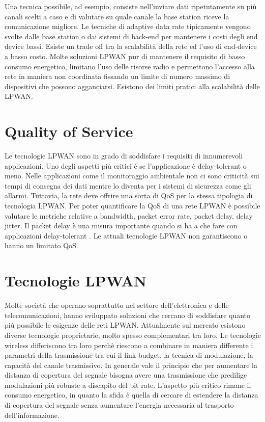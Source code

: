 \documentclass[12pt,a4paper,openright,twoside]{report}
\begin{document}
Una tecnica possibile, ad esempio, consiste nell'inviare dati ripetutamente su pi\`u canali scelti a caso e di valutare su quale canale la base station riceve la comunicazione migliore. 
Le tecniche di adaptive data rate tipicamente vengono svolte dalle base station o dai sistemi di back-end per mantenere i costi degli end device bassi.
Esiste un trade off tra la scalabilit\`a della rete ed l'uso di end-device a basso costo. 
Molte soluzioni LPWAN pur di mantenere il requisito di basso consumo energetico, limitano l'uso delle risorse radio e permettono l'accesso alla rete in maniera non coordinata fissando un limite di numero massimo di dispositivi che possono agganciarsi. 
Esistono dei limiti pratici alla scalabilit\`a delle LPWAN.

\section{Quality of Service}
Le tecnologie LPWAN sono in grado di soddisfare i requisiti di innumerevoli applicazioni. 
Uno degli aspetti pi\`u critici \`e se l'applicazione \`e delay-tolerant o meno. 
Nelle applicazioni come il monitoraggio ambientale non ci sono criticit\`a sui tempi di consegna dei dati mentre lo diventa per i sistemi di sicurezza come gli allarmi. 
Tuttavia, la rete deve offrire una sorta di QoS per la stessa tipologia di tecnologia LPWAN.
Per poter quantificare la QoS di una rete LPWAN \`e possibile valutare le metriche relative a bandwidth, packet error rate, packet delay, delay jitter. 
Il packet delay \`e una misura importante quando si ha a che fare con applicazioni delay-tolerant \cite{K5}. 
Le attuali tecnologie LPWAN non garantiscono o hanno un limitato QoS.

\section{Tecnologie LPWAN}
Molte societ\`a che operano soprattutto nel settore dell'elettronica e delle telecomunicazioni, hanno sviluppato soluzioni che cercano di soddisfare quanto pi\`u possibile le esigenze delle reti LPWAN. 
Attualmente sul mercato esistono diverse tecnologie proprietarie, molto spesso complementari tra loro. 
Le tecnologie wireless differiscono tra loro perch\`e riescono a combinare in maniera differente i parametri della trasmissione tra cui il link budget, la tecnica di modulazione, la capacit\`a del canale trasmissivo.  
In generale vale il principio che per aumentare la distanza di copertura del segnale bisogna avere una trasmissione che predilige modulazioni pi\`u robuste a discapito del bit rate. 
L'aspetto pi\`u critico rimane il consumo energetico, in quanto la sfida \`e quella di cercare di estendere la distanza di copertura del segnale senza aumentare l'energia necessaria al trasporto dell'informazione.
\end{document}
